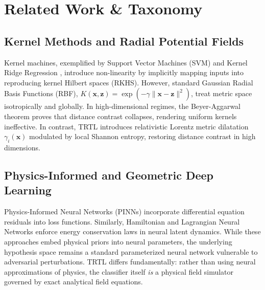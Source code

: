 \documentclass[journal,twoside]{IEEEtran}
\theoremstyle{remark}
\begin{document}
\section{Related Work \& Taxonomy}

\subsection{Kernel Methods and Radial Potential Fields}
Kernel machines, exemplified by Support Vector Machines (SVM) \cite{cortes1995support} and Kernel Ridge Regression \cite{shawe2004kernel}, introduce non-linearity by implicitly mapping inputs into reproducing kernel Hilbert spaces (RKHS). However, standard Gaussian Radial Basis Functions (RBF), $K(\mathbf{x}, \mathbf{z}) = \exp(-\gamma \|\mathbf{x} - \mathbf{z}\|^2)$, treat metric space isotropically and globally. In high-dimensional regimes, the Beyer-Aggarwal theorem \cite{beyer1999nearest} proves that distance contrast collapses, rendering uniform kernels ineffective. In contrast, TRTL introduces relativistic Lorentz metric dilatation $\gamma_i(\mathbf{x})$ modulated by local Shannon entropy, restoring distance contrast in high dimensions.

\subsection{Physics-Informed and Geometric Deep Learning}
Physics-Informed Neural Networks (PINNs) \cite{raissi2019physics} incorporate differential equation residuals into loss functions. Similarly, Hamiltonian and Lagrangian Neural Networks \cite{greydanus2019hamiltonian,cranmer2020lagrangian} enforce energy conservation laws in neural latent dynamics. While these approaches embed physical priors into neural parameters, the underlying hypothesis space remains a standard parameterized neural network vulnerable to adversarial perturbations. TRTL differs fundamentally: rather than using neural approximations of physics, the classifier itself \textit{is} a physical field simulator governed by exact analytical field equations.
\end{document}
